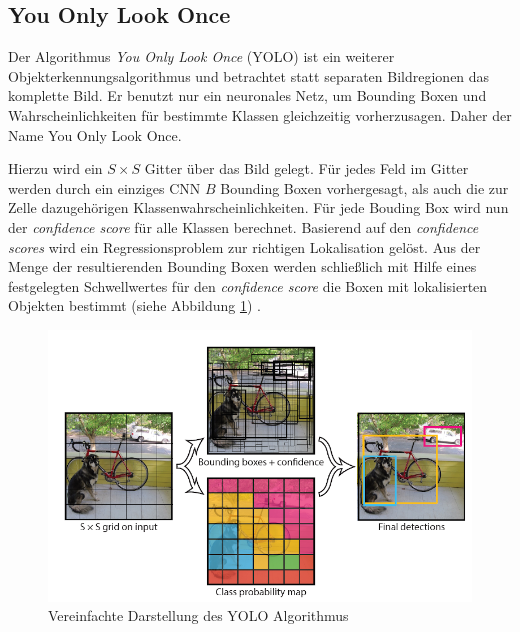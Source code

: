 \subsection*{You Only Look Once}

Der Algorithmus \textit{You Only Look Once} (YOLO) ist ein weiterer Objekterkennungsalgorithmus und betrachtet statt separaten Bildregionen das komplette Bild. Er benutzt nur ein neuronales Netz, um Bounding Boxen und Wahrscheinlichkeiten für bestimmte Klassen gleichzeitig vorherzusagen. Daher der Name \glqq You Only Look Once\grqq{}.

Hierzu wird ein $S \times S$ Gitter über das Bild gelegt. Für jedes Feld im Gitter werden durch ein einziges CNN $B$ Bounding Boxen vorhergesagt, als auch die zur Zelle dazugehörigen Klassenwahrscheinlichkeiten. Für jede Bouding Box wird nun der \textit{confidence score} für alle Klassen berechnet. Basierend auf den \textit{confidence scores} wird ein Regressionsproblem zur richtigen Lokalisation gelöst. Aus der Menge der resultierenden Bounding Boxen werden schließlich mit Hilfe eines festgelegten Schwellwertes für den \textit{confidence score} die Boxen mit lokalisierten Objekten bestimmt (siehe Abbildung \ref{yolo_model}) \cite{JosephRedmon.2016}.

\begin{figure}[H]
	\begin{center}
		\includegraphics[width=15cm]{Bilder/yolo_model.png} 
		\caption[Vereinfachte Darstellung des YOLO Algorithmus]{Vereinfachte Darstellung des YOLO Algorithmus \cite{JosephRedmon.2016}}
		\label{yolo_model}
	\end{center}
\end{figure}

\newpage

